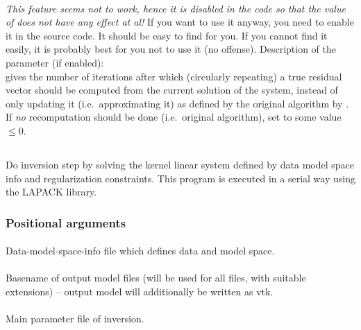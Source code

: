 \textbf{}\\
\emph{This feature seems not to work, hence it is disabled in the code so 
that the value of}  \emph{does not have any effect at al!}
If you want to use it anyway, you need to enable it in the source code. It should
be easy to find for you. If you cannot find it easily, it is probably best 
for you not to use it (no offense). Description of the parameter (if enabled):\\
 gives the number of iterations after which (circularly repeating) a true 
residual vector should be computed from the current solution of the system, instead of only updating it 
(i.e.\ approximating it) as defined by the original algorithm by \cite{bjorck1998stability}.
If \emph{no} recomputation should be done (i.e.\ original algorithm), set 
to some value $\le 0$.
%
%
\subsection{} \label{programs_scripts,sec:bin_prog,sec:sol_Ker_Sys}
Do inversion step by solving the kernel linear system defined by data model space info and regularization constraints. 
This program is executed in a serial way using the LAPACK library.

\subsubsection{Positional arguments}
\paragraph{}
Data-model-space-info file which defines data and model space.
\paragraph{}
Basename of output model files (will be used for all files, with suitable extensions) -- output model will additionally be written as vtk.
\paragraph{}
Main parameter file of inversion.
